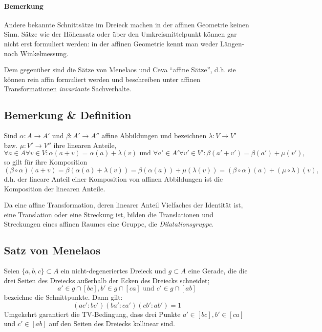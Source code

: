  	\paragraph{Bemerkung}
 		Andere bekannte Schnittsätze im Dreieck machen in der affinen Geometrie keinen Sinn. Sätze wie der Höhensatz oder über den Umkreismittelpunkt können gar nicht erst formuliert werden: in der affinen Geometrie kennt man weder Längen- noch Winkelmessung.

 		Dem gegenüber sind die Sätze von Menelaos und Ceva "`affine Sätze"', d.h. sie können rein affin formuliert werden und beschreiben unter affinen Transformationen \emph{invariante} Sachverhalte.
 \subsection{Bemerkung \& Definition}
 	Sind $ \alpha:A\to A' $ und $ \beta:A'\to A'' $ affine Abbildungen und bezeichnen $ \lambda:V\to V' $ bzw. $ \mu:V'\to V'' $ ihre linearen Anteile,
 	\[
 		\forall a\in A\forall v\in V:\alpha(a+v) = \alpha(a)+\lambda(v)\text{ und }\forall a'\in A'\forall v'\in V':\beta(a'+v') = \beta(a')+\mu(v'),
 	\]
 	so gilt für ihre Komposition
 	\[
 		(\beta\circ\alpha)(a+v) = \beta(\alpha(a)+\lambda(v)) = \beta(\alpha(a))+\mu(\lambda(v)) = (\beta\circ\alpha)(a)+(\mu\circ\lambda)(v),
 	\]
 	d.h. der lineare Anteil einer Komposition von affinen Abbildungen ist die Komposition der linearen Anteile.

 	\begin{Definition}[Dilatationsgruppe]
 		Da eine affine Transformation, deren linearer Anteil Vielfaches der Identität ist, eine Translation oder eine Streckung ist, bilden die Translationen und Streckungen eines affinen Raumes eine Gruppe, die \emph{Dilatationsgruppe}.
 	\end{Definition}

 \subsection{Satz von Menelaos}
 	\begin{Satz}
 		Seien $ \{a,b,c\}\subset A $ ein nicht-degeneriertes Dreieck und $ g\subset A $ eine Gerade, die die drei Seiten des Dreiecks außerhalb der Ecken des Dreiecks schneidet;
 		\[
 			a'\in g\cap [bc],b'\in g\cap [ca] \text{ und }c'\in g\cap [ab]
 		\]
 		bezeichne die Schnittpunkte. Dann gilt:
 		\[
 			(ac':bc')(ba':ca')(cb':ab') = 1
 		\]
 		Umgekehrt garantiert die TV-Bedingung, dass drei Punkte $ a'\in [bc],b'\in [ca] $ und $ c'\in [ab] $ auf den Seiten des Dreiecks kollinear sind.
 	\end{Satz}

